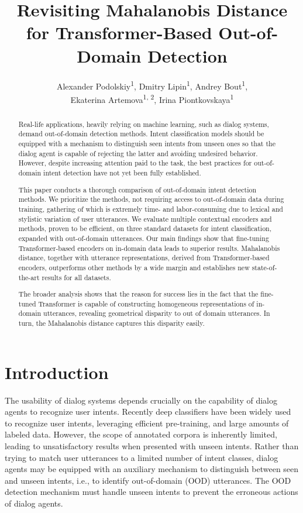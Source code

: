 \documentclass[letterpaper, final]{article} %
\title{Revisiting Mahalanobis Distance for Transformer-Based Out-of-Domain Detection}
\author{
Alexander Podolskiy\textsuperscript{\rm 1}, Dmitry Lipin\textsuperscript{\rm 1}, Andrey Bout\textsuperscript{\rm 1},\\
Ekaterina Artemova\textsuperscript{\rm 1, 2},  Irina Piontkovskaya\textsuperscript{\rm 1}\\
}
\begin{document}
\maketitle

\begin{abstract}
Real-life applications, heavily relying on machine learning, such as dialog systems, demand out-of-domain detection methods. Intent classification models should be equipped with a mechanism to distinguish seen intents from unseen ones so that the dialog agent is capable of rejecting the latter and avoiding undesired behavior. However, despite increasing attention paid to the task, the best practices for out-of-domain intent detection have not yet been fully established. 

This paper conducts a thorough comparison of out-of-domain intent detection methods. We prioritize the methods, not requiring access to out-of-domain data during training, gathering of which is extremely time- and labor-consuming due to lexical and stylistic variation of user utterances. We evaluate multiple contextual encoders and methods, proven to be efficient, on three standard datasets for intent classification, expanded with out-of-domain utterances. Our main findings show that fine-tuning Transformer-based encoders on in-domain data leads to superior results. Mahalanobis distance, together with utterance representations, derived from Transformer-based encoders, outperforms other methods by a wide margin and establishes new state-of-the-art results for all datasets. 

The broader analysis shows that the reason for success lies in the fact that the fine-tuned Transformer is capable of constructing homogeneous representations of in-domain utterances, revealing geometrical disparity to out of domain utterances. In turn, the Mahalanobis distance captures this disparity easily.  



\end{abstract}

\section{Introduction}

The usability of dialog systems depends crucially on the capability of dialog agents to recognize user intents. Recently deep classifiers have been widely used to recognize user intents, leveraging efficient pre-training, and large amounts of labeled data. However, the scope of annotated corpora is inherently limited, leading to unsatisfactory results when presented with unseen intents. Rather than trying to match user utterances to a limited number of intent classes, dialog agents may be equipped with an auxiliary mechanism to distinguish between seen and unseen intents, i.e., to identify out-of-domain (OOD) utterances. The OOD detection mechanism must handle unseen intents to prevent the erroneous actions of dialog agents.  
\end{document}
